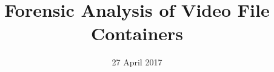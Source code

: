 \documentclass{beamer}
\title{\huge Forensic Analysis of Video File Containers}
\date{27 April 2017}
\begin{document}
\titlepageframe



\end{document}
